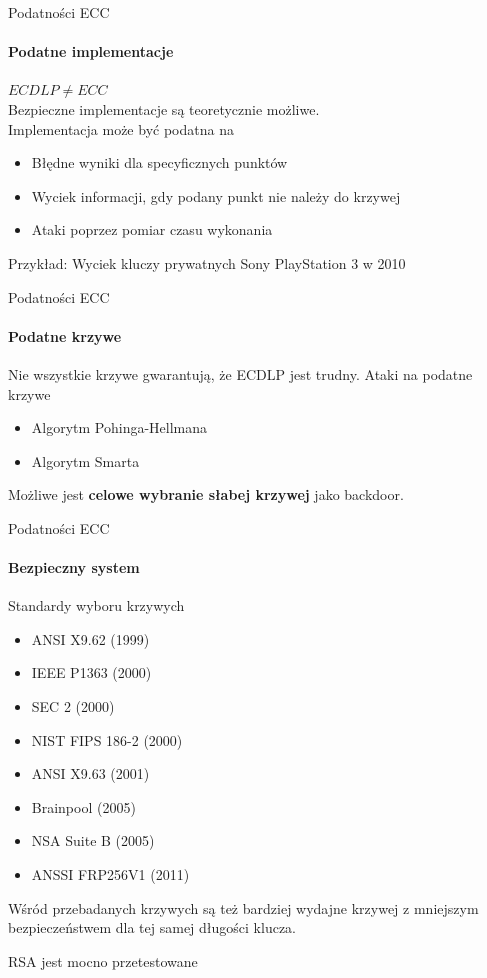 \begin{frame}{Podatności ECC}
\framesubtitle{Podatne implementacje}
\textbf{$ECDLP \neq ECC$} \\
\pause
Bezpieczne implementacje są teoretycznie możliwe. \\
Implementacja może być podatna na \cite{SafeCurves}
\begin{itemize}
    \item Błędne wyniki dla specyficznych punktów
    \item Wyciek informacji, gdy podany punkt nie należy do krzywej
    \item Ataki poprzez pomiar czasu wykonania
\end{itemize}
\pause
\vspace{3mm}
Przykład: Wyciek kluczy prywatnych Sony PlayStation 3 w 2010 \cite{ConsoleHacking2010}
\pause
\end{frame}

\begin{frame}{Podatności ECC}
\framesubtitle{Podatne krzywe}
Nie wszystkie krzywe gwarantują, że ECDLP jest trudny.
Ataki na podatne krzywe \cite{WeakCurvesInEllipticCurveCryptography}
\begin{itemize}
    \item Algorytm Pohinga-Hellmana
    \item Algorytm Smarta
\end{itemize}
\pause
\vspace{3mm}
Możliwe jest \textbf{celowe wybranie słabej krzywej} jako backdoor.
\end{frame}

\begin{frame}{Podatności ECC}
    \framesubtitle{Bezpieczny system}
    Standardy wyboru krzywych
    \begin{scriptsize}
        \begin{itemize}
            \item ANSI X9.62 (1999)
            \item IEEE P1363 (2000)
            \item SEC 2 (2000)
            \item NIST FIPS 186-2 (2000)
            \item ANSI X9.63 (2001)
            \item Brainpool (2005)
            \item NSA Suite B (2005)
            \item ANSSI FRP256V1 (2011)
        \end{itemize}
    \end{scriptsize}
    \pause
    \vspace{3mm}
    Wśród przebadanych krzywych są też bardziej wydajne krzywej z mniejszym bezpieczeństwem dla tej samej długości klucza.
\end{frame}

\begin{frame}{RSA jest mocno przetestowane}
\end{frame}
